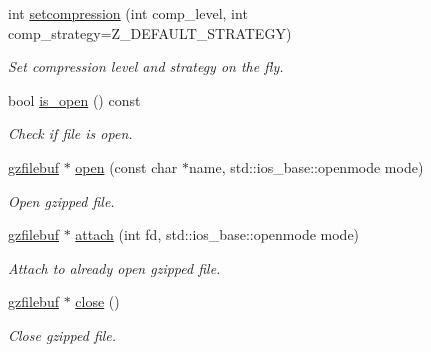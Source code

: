 \begin{DoxyCompactItemize}
\item 
int \hyperlink{classgzfilebuf_ad109ea4fc4ca7cc19d8014b53375255d}{setcompression} (int comp\+\_\+level, int comp\+\_\+strategy=Z\+\_\+\+D\+E\+F\+A\+U\+L\+T\+\_\+\+S\+T\+R\+A\+T\+E\+G\+Y)
\begin{DoxyCompactList}\small\item\em Set compression level and strategy on the fly. \end{DoxyCompactList}\item 
bool \hyperlink{classgzfilebuf_a93ffc20f346d08dc295b799c92becffc}{is\+\_\+open} () const 
\begin{DoxyCompactList}\small\item\em Check if file is open. \end{DoxyCompactList}\item 
\hyperlink{classgzfilebuf}{gzfilebuf} $\ast$ \hyperlink{classgzfilebuf_a9582843a0caa22cb1b4ead1c687dabb2}{open} (const char $\ast$name, std\+::ios\+\_\+base\+::openmode mode)
\begin{DoxyCompactList}\small\item\em Open gzipped file. \end{DoxyCompactList}\item 
\hyperlink{classgzfilebuf}{gzfilebuf} $\ast$ \hyperlink{classgzfilebuf_ae8a47750ca65bc2a43b4768b47f3923a}{attach} (int fd, std\+::ios\+\_\+base\+::openmode mode)
\begin{DoxyCompactList}\small\item\em Attach to already open gzipped file. \end{DoxyCompactList}\item 
\hyperlink{classgzfilebuf}{gzfilebuf} $\ast$ \hyperlink{classgzfilebuf_a280d1c661fb371c22de1214d5a1682a2}{close} ()
\begin{DoxyCompactList}\small\item\em Close gzipped file. \end{DoxyCompactList}\end{DoxyCompactItemize}
